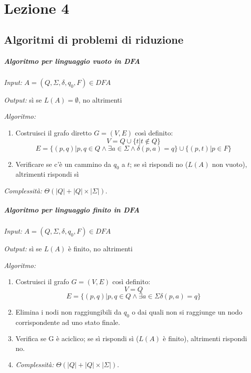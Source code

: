 
\section{Lezione 4}
\subsection{Algoritmi di problemi di riduzione}
\subparagraph{Algoritmo per linguaggio vuoto in DFA}
\begin{description}
	\item \emph{Input:} $A = (Q, \Sigma, \delta, q_0, F) \in DFA$
	\item \emph{Output:} s\`i se $L(A)=\emptyset$, no altrimenti
	\item \emph{Algoritmo:}\newline
		\begin{enumerate}
			\item Costruisci il grafo diretto $G=(V,E)$ cos\`i definito:
			\[
				V = Q \cup \{t | t \notin Q \}
			\]
			\[
				E = \{(p,q) | p, q \in Q \land \exists a \in \Sigma \land \delta(p, a) = q \} \cup \{(p,t) | p \in F\}			
			\]
			\item Verificare se c'\`e un cammino da $q_0$ a $t$; se s\`i rispondi no ($L(A)$ non vuoto), altrimenti rispondi s\`i
		\end{enumerate}
	\item \emph{Complessit\`a:} $\Theta (|Q|+|Q|\times|\Sigma|)$.
\end{description}
\subparagraph{Algoritmo per linguaggio finito in DFA}
\begin{description}
	\item \emph{Input:} $A = (Q, \Sigma, \delta, q_0, F) \in DFA$
	\item \emph{Output:} s\`i se $L(A)$ \`e finito, no altrimenti
	\item \emph{Algoritmo:}
		\begin{enumerate}
			\item Costruisci il grafo $G=(V,E)$ cos\`i definito:
			\[
				V = Q			
			\] 
			\[
				E = \{(p,q) | p, q \in Q \land \exists a \in \Sigma \delta(p,a) = q\}
			\]
			\item Elimina i nodi non raggiungibili da $q_0$ o dai quali non si raggiunge un nodo corrispondente ad uno stato finale.
			\item Verifica se G \`e aciclico; se s\`i rispondi s\`i ($L(A)$ \`e finito), altrimenti rispondi no.
	\item \emph{Complessit\`a:} $\Theta (|Q|+|Q|\times|\Sigma|)$.
		\end{enumerate}
\end{description}
